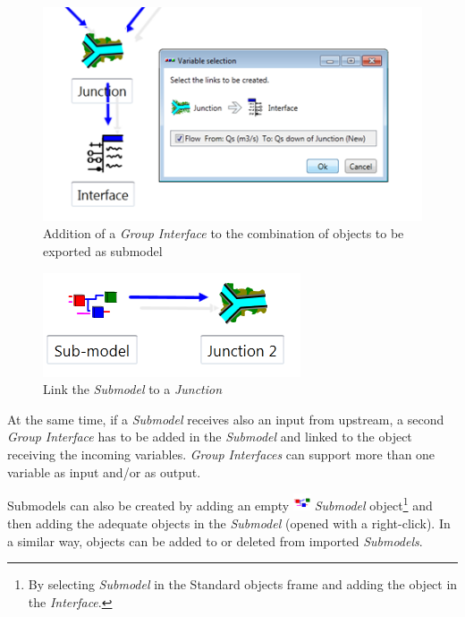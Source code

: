 \documentclass[
  letterpaper,
  DIV=11,
  numbers=noendperiod]{scrreprt}
\begin{document}
\begin{figure}

{\centering \includegraphics{./figures/fig-addition_group_interface.png}

}

\caption{\label{fig-addition_group_interface}Addition of a \emph{Group
Interface} to the combination of objects to be exported as submodel}

\end{figure}

\begin{figure}

{\centering \includegraphics{./figures/fig-link_submodel_junction.png}

}

\caption{\label{fig-link_submodel_junction}Link the \emph{Submodel} to a
\emph{Junction}}

\end{figure}

At the same time, if a \emph{Submodel} receives also an input from
upstream, a second \emph{Group Interface} has to be added in the
\emph{Submodel} and linked to the object receiving the incoming
variables. \emph{Group Interfaces} can support more than one variable as
input and/or as output.

Submodels can also be created by adding an empty
\includegraphics[width=0.2in,height=0.2in]{./figures/fig-icon_object_submodel.png}
\emph{Submodel} object\footnote{By selecting \emph{Submodel} in the
  Standard objects frame and adding the object in the \emph{Interface}.}
and then adding the adequate objects in the \emph{Submodel} (opened with
a right-click). In a similar way, objects can be added to or deleted
from imported \emph{Submodels}.
\end{document}
